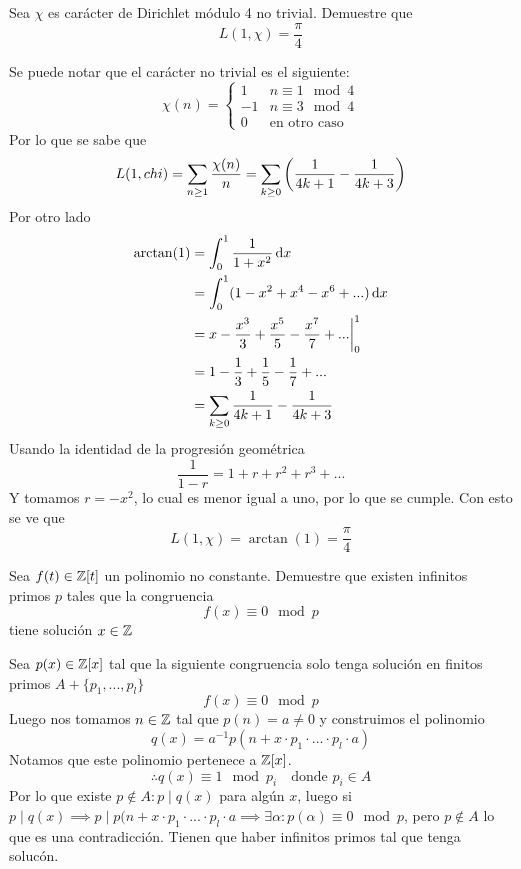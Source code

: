 \begin{prob}[4 pts.]
	Sea $\chi$ es carácter de Dirichlet módulo 4 no trivial. Demuestre que
	\[L(1,\chi)=\frac\pi4\]
\end{prob}

\begin{sol}
	Se puede notar que el carácter no trivial es el siguiente:
	\begin{displaymath}
		\chi(n)=\begin{cases}
			1  & n\equiv1\mod4       \\
			-1 & n\equiv3\mod4       \\
			0  & \text{en otro caso}
		\end{cases}
	\end{displaymath}
	Por lo que se sabe que
	\[
		L(1,chi)=\sum_{n\geq1}\frac{\chi(n)}{n}=\sum_{k\geq0}\left(\frac1{4k+1}-\frac1{4k+3}\right)
	\]
	Por otro lado
	\begin{align*}
		\arctan(1) & =\int_0^1\frac1{1+x^2}\operatorname{d}\!{x}                               \\
		           & =\int_0^1(1-x^2+x^4-x^6+...)\operatorname{d}\!{x}                         \\
		           & =x-\frac{x^3}3+\frac{x^5}5-\frac{x^7}7+...\bigg\rvert_0^1 \\
		           & = 1 -\frac13+\frac15-\frac17+...                          \\
		           & =\sum_{k\geq0}\frac1{4k+1}-\frac1{4k+3}
	\end{align*}
	Usando la identidad de la progresión geométrica
	\[\frac1{1-r}=1+r+r^2+r^3+...\]
	Y tomamos $r=-x^2$, lo cual es menor igual a uno, por lo que se cumple. Con esto se ve que
	\[L(1,\chi)=\arctan(1)=\frac\pi4\]
\end{sol}

\begin{prob}[4 pts.]
	Sea $f(t)\in\mathbb{Z}[t]$ un polinomio no constante. Demuestre que existen infinitos primos $p$ tales que la congruencia
	\[f(x)\equiv 0\mod p\]
	tiene solución $x\in\mathbb{Z}$
\end{prob}

\begin{sol}
	Sea $p(x)\in\mathbb{Z}[x]$ tal que la siguiente congruencia solo tenga solución en finitos primos $A+\{p_1,...,p_l\}$
	\begin{displaymath}
		f(x)\equiv 0\mod p
	\end{displaymath}
	Luego nos tomamos $n\in\mathbb{Z}$ tal que $p(n)=a\neq 0$ y construimos el polinomio
	\begin{displaymath}
		q(x)=a^{-1}p(n+x\cdot p_1\cdot...\cdot p_l\cdot a)
	\end{displaymath}
	Notamos que este polinomio pertenece a $\mathbb{Z}[x]$.
	\begin{displaymath}
		\therefore q(x)\equiv 1\mod p_i\quad\text{donde $p_i\in A$}
	\end{displaymath}
	Por lo que existe $p\notin A: p\mid q(x)$ para algún $x$, luego si $p\mid q(x)\implies p\mid p(n+x\cdot p_1\cdot...\cdot p_l\cdot a\implies \exists \alpha:p(\alpha)\equiv 0\mod p$, pero $p\notin A$ lo que es una contradicción. Tienen que haber infinitos primos tal que tenga solucón.
\end{sol}

